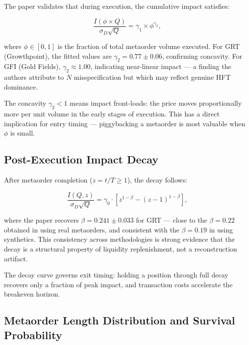 \documentclass[12pt,a4paper]{article}
\begin{document}
The paper validates that during execution, the cumulative impact satisfies:

\begin{equation}
  \frac{I(\phi \times Q)}{\sigma_D \sqrt{Q}} = \gamma_1 \times \phi^{\gamma_2},
  \label{eq:concave}
\end{equation}

\noindent where $\phi \in [0,1]$ is the fraction of total metaorder volume
executed. For GRT (Growthpoint), the fitted values are $\gamma_2 = 0.77 \pm
0.06$, confirming concavity. For GFI (Gold Fields), $\gamma_2 \approx 1.00$,
indicating near-linear impact --- a finding the authors attribute to
$N$ misspecification but which may reflect genuine HFT dominance.

The concavity $\gamma_2 < 1$ means impact front-loads: the price moves
proportionally more per unit volume in the early stages of execution. This has
a direct implication for entry timing --- piggybacking a metaorder is most
valuable when $\phi$ is small.

\subsection{Post-Execution Impact Decay}

After metaorder completion ($z = t/T \geq 1$), the decay follows:

\begin{equation}
  \frac{I(Q, z)}{\sigma_D \sqrt{Q}} = \gamma_0 \cdot
    \left[ z^{1-\beta} - (z-1)^{1-\beta} \right],
  \label{eq:decay}
\end{equation}

\noindent where the paper recovers $\beta = 0.241 \pm 0.033$ for GRT --- close
to the $\beta = 0.22$ obtained in \citet{brokmann2014} using real metaorders,
and consistent with the $\beta = 0.19$ in \citet{maitrier2025} using synthetics.
This consistency across methodologies is strong evidence that the decay is a
structural property of liquidity replenishment, not a reconstruction artifact.

The decay curve governs exit timing: holding a position through full decay
recovers only a fraction of peak impact, and transaction costs accelerate the
breakeven horizon.

\subsection{Metaorder Length Distribution and Survival Probability}
\end{document}
